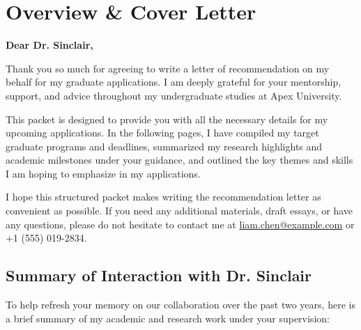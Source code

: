 \thispagestyle{empty}

\section{Overview \& Cover Letter}

\noindent
\textbf{Dear Dr. Sinclair,}

\medskip\noindent
Thank you so much for agreeing to write a letter of recommendation on my behalf for my graduate applications. I am deeply grateful for your mentorship, support, and advice throughout my undergraduate studies at Apex University. 

\medskip\noindent
This packet is designed to provide you with all the necessary details for my upcoming applications. In the following pages, I have compiled my target graduate programs and deadlines, summarized my research highlights and academic milestones under your guidance, and outlined the key themes and skills I am hoping to emphasize in my applications.

\medskip\noindent
I hope this structured packet makes writing the recommendation letter as convenient as possible. If you need any additional materials, draft essays, or have any questions, please do not hesitate to contact me at \href{mailto:liam.chen@example.com}{liam.chen@example.com} or +1 (555) 019-2834.

\vspace{1.5em}

\subsection*{Summary of Interaction with Dr. Sinclair}
To help refresh your memory on our collaboration over the past two years, here is a brief summary of my academic and research work under your supervision:


